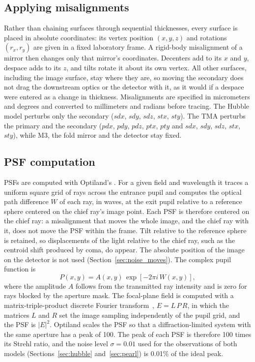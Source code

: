 \subsection{Applying misalignments}
Rather than chaining surfaces through sequential thicknesses, every surface is placed in absolute coordinates: its vertex position $(x,y,z)$ and rotations $(r_x,r_y)$ are given in a fixed laboratory frame. A rigid-body misalignment of a mirror then changes only that mirror's coordinates. Decenters add to its $x$ and $y$, despace adds to its $z$, and tilts rotate it about its own vertex. All other surfaces, including the image surface, stay where they are, so moving the secondary does not drag the downstream optics or the detector with it, as it would if a despace were entered as a change in thickness. Misalignments are specified in micrometers and degrees and converted to millimeters and radians before tracing. The Hubble model perturbs only the secondary ($sdx$, $sdy$, $sdz$, $stx$, $sty$). The TMA perturbs the primary and the secondary ($pdx$, $pdy$, $pdz$, $ptx$, $pty$ and $sdx$, $sdy$, $sdz$, $stx$, $sty$), while M3, the fold mirror and the detector stay fixed.

\subsection{PSF computation}
PSFs are computed with Optiland's . For a given field and wavelength it traces a uniform square grid of rays across the entrance pupil and computes the optical path difference $W$ of each ray, in waves, at the exit pupil relative to a reference sphere centered on the chief ray's image point. Each PSF is therefore centered on the chief ray: a misalignment that moves the whole image, and the chief ray with it, does not move the PSF within the frame. Tilt relative to the reference sphere is retained, so displacements of the light relative to the chief ray, such as the centroid shift produced by coma, do appear. The absolute position of the image on the detector is not used (Section~\ref{sec:noise_moves}). The complex pupil function is
\begin{equation}
P(x,y) = A(x,y)\,\exp\!\left[-2\pi i\,W(x,y)\right],
\end{equation}
where the amplitude $A$ follows from the transmitted ray intensity and is zero for rays blocked by the aperture mask. The focal-plane field is computed with a matrix-triple-product discrete Fourier transform~\citep{Soummer2007}, $E = L\,P\,R$, in which the matrices $L$ and $R$ set the image sampling independently of the pupil grid, and the PSF is $|E|^2$. Optiland scales the PSF so that a diffraction-limited system with the same aperture has a peak of 100. The peak of each PSF is therefore 100 times its Strehl ratio, and the noise level $\sigma=0.01$ used for the observations of both models (Sections~\ref{sec:hubble} and~\ref{sec:pearl}) is 0.01\% of the ideal peak.

